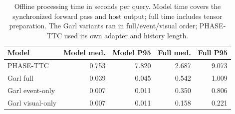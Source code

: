 \begin{table}[H]
\centering\small
\caption{Offline processing time in seconds per query. Model time covers the synchronized forward pass and host output; full time includes tensor preparation. The Garl variants ran in full/event/visual order; PHASE-TTC used its own adapter and history length. }
\label{tab:evttc-runtime}
\begin{tabular}{@{}lrrrr@{}}
\toprule
\textbf{Model} & \textbf{Model med.} & \textbf{Model P95} & \textbf{Full med.} & \textbf{Full P95} \\
\midrule
PHASE-TTC & 0.753 & 7.820 & 2.687 & 9.073 \\
Garl full & 0.039 & 0.045 & 0.542 & 1.009 \\
Garl event-only & 0.007 & 0.011 & 0.350 & 0.806 \\
Garl visual-only & 0.007 & 0.011 & 0.158 & 0.221 \\
\bottomrule
\end{tabular}
\end{table}
